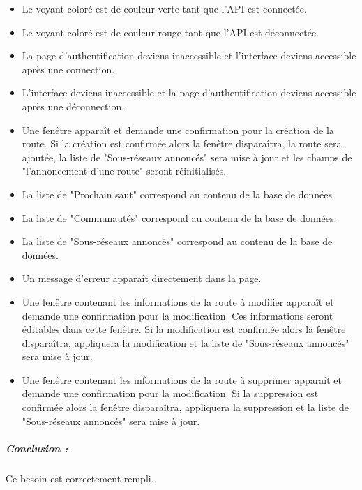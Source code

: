    \begin{itemize}
    \item Le voyant coloré est de couleur verte tant que l'API est connectée.%
    \item Le voyant coloré est de couleur rouge tant que l'API est déconnectée.%
    \item La page d'authentification deviens inaccessible et l'interface deviens accessible après une connection.%
    \item L'interface deviens inaccessible et la page d'authentification deviens accessible après une déconnection.%
    \item Une fenêtre apparaît et demande une confirmation pour la création de la route. Si la création est confirmée alors la fenêtre disparaîtra, la route sera ajoutée, la liste de "Sous-réseaux annoncés" sera mise à jour et les champs de "l'annoncement d'une route" seront réinitialisés.%
    \item La liste de "Prochain saut" correspond au contenu de la base de données%
    \item La liste de "Communautés" correspond au contenu de la base de données.%
    \item La liste de "Sous-réseaux annoncés" correspond au contenu de la base de données.%
    \item Un message d'erreur apparaît directement dans la page.%
    \item Une fenêtre contenant les informations de la route à modifier apparaît et demande une confirmation pour la modification. Ces informations seront éditables dans cette fenêtre. Si la modification est confirmée alors la fenêtre disparaîtra, appliquera la modification et la liste de "Sous-réseaux annoncés" sera mise à jour.%
    \item Une fenêtre contenant les informations de la route à supprimer apparaît et demande une confirmation pour la modification. Si la suppression est confirmée alors la fenêtre disparaîtra, appliquera la suppression et la liste de "Sous-réseaux annoncés" sera mise à jour.%

\end{itemize}
\subparagraph{Conclusion :}Ce besoin est correctement rempli.

